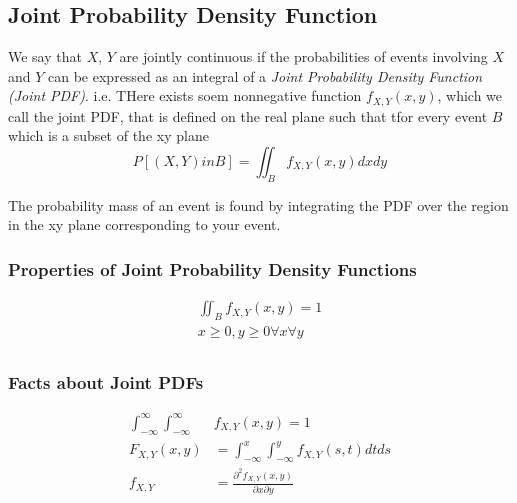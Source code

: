 	\subsection[Joint PDF]{Joint Probability Density Function} \label{subsec:Joint PDF}
		\begin{definition} \label{def:Joint PDF}
			We say that $X$, $Y$ are jointly continuous if the probabilities of events involving $X$ and $Y$ can be expressed as an integral of a \emph{Joint Probability Density Function (Joint PDF)}. \newline
			i.e. THere exists soem nonnegative function $f_{X,Y} \left( x,y \right)$, which we call the joint PDF, that is defined on the real plane such that tfor every event $B$ which is a subset of the xy plane
			\begin{equation}\label{eq:Joint PDF}
				P \left[ \left( X,Y \right) in B \right] = \iint_{B} f_{X,Y} \left( x,y \right) dx dy
			\end{equation}
			\begin{remark}
				The probability mass of an event is found by integrating the PDF over the region in the xy plane corresponding to your event.
			\end{remark}
		\end{definition}
	
		\subsubsection{Properties of Joint Probability Density Functions} \label{subsubsec:Joint PDF Properties}
			\begin{gather}
				\iint_{B} f_{X,Y} \left( x,y \right) = 1 \\
				x \geq 0, y \geq 0 \forall x \forall y \\
			\end{gather}
			
		\subsubsection{Facts about Joint PDFs} \label{subsubsec:Joint PDF Facts}
			\begin{align}
				\int_{-\infty}^{\infty} \int_{-\infty}^{\infty} &f_{X,Y} \left( x,y \right) = 1 \\
				F_{X,Y} \left( x,y \right) &= \int_{-\infty}^{x} \int_{-\infty}^{y} f_{X,Y} \left( s,t \right) dt ds \\
				f_{X,Y} &= \frac{\partial^{2} f_{X,Y} \left( x,y \right)}{\partial x \partial y} \\
			\end{align}
			
